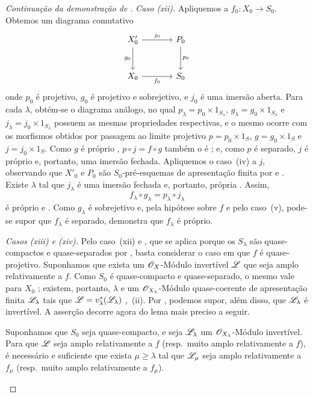 \begin{proof}[Continuação da demonstração de ]
\emph{Caso (xii).} Apliquemos  a $f_0:X_0\to S_0$. Obtemos um diagrama comutativo
\[
\begin{tikzcd}[column sep=large,row sep=large]
X'_0 \arrow[r,"j_0"] \arrow[d,"g_0"'] & P_0 \arrow[d,"p_0"] \\
X_0 \arrow[r,"f_0"'] & S_0
\end{tikzcd}
\]
onde $p_0$ é projetivo, $g_0$ é projetivo e sobrejetivo, e $j_0$ é uma imersão aberta. Para cada $\lambda$, obtém-se o diagrama análogo, no qual $p_\lambda=p_0\times1_{S_\lambda}$, $g_\lambda=g_0\times1_{S_\lambda}$ e $j_\lambda=j_0\times1_{S_\lambda}$ possuem as mesmas propriedades respectivas, e o mesmo ocorre com os morfismos obtidos por passagem ao limite projetivo $p=p_0\times1_S$, $g=g_0\times1_S$ e $j=j_0\times1_S$. Como $g$ é próprio , $p\circ j=f\circ g$ também o é ; e, como $p$ é separado, $j$ é próprio e, portanto, uma imersão fechada. Apliquemos o caso~(iv) a $j$, observando que $X'_0$ e $P_0$ são $S_0$-pré-esquemas de apresentação finita por  e . Existe $\lambda$ tal que $j_\lambda$ é uma imersão fechada e, portanto, própria . Assim,
\[
  f_\lambda\circ g_\lambda=p_\lambda\circ j_\lambda
\]
é próprio  e . Como $g_\lambda$ é sobrejetivo e, pela hipótese sobre $f$ e pelo caso~(v), pode-se supor que $f_\lambda$ é separado,  demonstra que $f_\lambda$ é próprio.

\emph{Casos (xiii) e (xiv).} Pelo caso~(xii) e , que se aplica porque os $S_\lambda$ são quase-compactos e quase-separados por , basta considerar o caso em que $f$ é quase-projetivo. Suponhamos que exista um $\mathscr{O}_X$-Módulo invertível $\mathscr{L}$ que seja amplo relativamente a $f$. Como $S_0$ é quase-compacto e quase-separado, o mesmo vale para $X_0$ ; existem, portanto, $\lambda$ e um $\mathscr{O}_{X_\lambda}$-Módulo quase-coerente de apresentação finita $\mathscr{L}_\lambda$ tais que $\mathscr{L}=v_\lambda^*(\mathscr{L}_\lambda)$ ,~(ii). Por , podemos supor, além disso, que $\mathscr{L}_\lambda$ é invertível. A asserção decorre agora do lema mais preciso a seguir.

\begin{lemma}[8.10.5.2]
\label{IV.8.10.5.2}
Suponhamos que $S_0$ seja quase-compacto, e seja $\mathscr{L}_\lambda$ um $\mathscr{O}_{X_\lambda}$-Módulo invertível. Para que $\mathscr{L}$ seja amplo relativamente a $f$ (resp.\ muito amplo relativamente a $f$), é necessário e suficiente que exista $\mu\geqslant\lambda$ tal que $\mathscr{L}_\mu$ seja amplo relativamente a $f_\mu$ (resp.\ muito amplo relativamente a $f_\mu$).
\end{lemma}


\end{proof}
